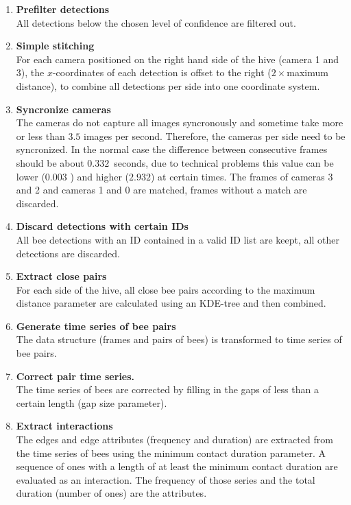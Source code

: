 \begin{enumerate}
\item \textbf{Prefilter detections}\\
All detections below the chosen level of confidence are filtered out.

\item \textbf{Simple stitching}\\
For each camera positioned on the right hand side of the hive (camera 1 and 3), the $x$-coordinates of each detection is offset to the right ($2\times$maximum distance), to combine all detections per side into one coordinate system.

\item \textbf{Syncronize cameras}\\
The cameras do not capture all images syncronously and sometime take more or less than $3.5$ images per second.
Therefore, the cameras per side need to be syncronized. In the normal case the difference between consecutive frames should be about $0.332$~seconds, due to technical problems this value can be lower ($0.003$ ) and higher ($2.932$) at certain times. The frames of cameras 3 and 2 and cameras 1 and 0 are matched, frames without a match are discarded.

\item \textbf{Discard detections with certain IDs}\\
All bee detections with an ID contained in a valid ID list are keept, all other detections are discarded.

\item \textbf{Extract close pairs}\\
For each side of the hive, all close bee pairs according to the maximum distance parameter are calculated using an KDE-tree and then combined.

\item \textbf{Generate time series of bee pairs}\\
The data structure (frames and pairs of bees) is transformed to time series of bee pairs.

\item \textbf{Correct pair time series.}\\
The time series of bees are corrected by filling in the gaps of less than a certain length (gap size parameter).

\item \textbf{Extract interactions}\\
The edges and edge attributes (frequency and duration) are extracted from the time series of bees using the minimum contact duration parameter.
A sequence of ones with a length of at least the minimum contact duration are evaluated as an interaction.
The frequency of those series and the total duration (number of ones) are the attributes.
\end{enumerate}


